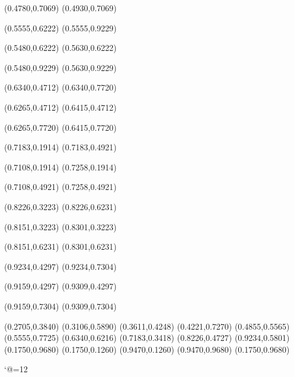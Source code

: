 \PST@Solid(0.4780,0.7069)
(0.4930,0.7069)

\PST@Solid(0.5555,0.6222)
(0.5555,0.9229)

\PST@Solid(0.5480,0.6222)
(0.5630,0.6222)

\PST@Solid(0.5480,0.9229)
(0.5630,0.9229)

\PST@Solid(0.6340,0.4712)
(0.6340,0.7720)

\PST@Solid(0.6265,0.4712)
(0.6415,0.4712)

\PST@Solid(0.6265,0.7720)
(0.6415,0.7720)

\PST@Solid(0.7183,0.1914)
(0.7183,0.4921)

\PST@Solid(0.7108,0.1914)
(0.7258,0.1914)

\PST@Solid(0.7108,0.4921)
(0.7258,0.4921)

\PST@Solid(0.8226,0.3223)
(0.8226,0.6231)

\PST@Solid(0.8151,0.3223)
(0.8301,0.3223)

\PST@Solid(0.8151,0.6231)
(0.8301,0.6231)

\PST@Solid(0.9234,0.4297)
(0.9234,0.7304)

\PST@Solid(0.9159,0.4297)
(0.9309,0.4297)

\PST@Solid(0.9159,0.7304)
(0.9309,0.7304)

\PST@Diamond(0.2705,0.3840)
\PST@Diamond(0.3106,0.5890)
\PST@Diamond(0.3611,0.4248)
\PST@Diamond(0.4221,0.7270)
\PST@Diamond(0.4855,0.5565)
\PST@Diamond(0.5555,0.7725)
\PST@Diamond(0.6340,0.6216)
\PST@Diamond(0.7183,0.3418)
\PST@Diamond(0.8226,0.4727)
\PST@Diamond(0.9234,0.5801)
\PST@Border(0.1750,0.9680)
(0.1750,0.1260)
(0.9470,0.1260)
(0.9470,0.9680)
(0.1750,0.9680)

\catcode`@=12
\fi
\endpspicture
